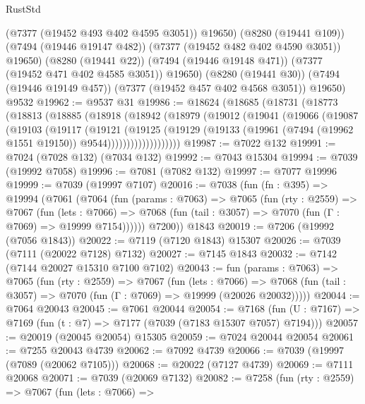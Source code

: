 \begin{lexlean}{RustStd}
\begin{coremodule}
            (@7377 (@19452 @493 @402 @4595 @3051))
            @19650)
          (@8280 (@19441 @109))
          (@7494 (@19446 @19147 @482))
          (@7377 (@19452 @482 @402 @4590 @3051))
          @19650)
        (@8280 (@19441 @22))
        (@7494 (@19446 @19148 @471))
        (@7377 (@19452 @471 @402 @4585 @3051))
        @19650)
      (@8280 (@19441 @30))
      (@7494 (@19446 @19149 @457))
      (@7377 (@19452 @457 @402 @4568 @3051))
      @19650)
    @9532
@19962 := @9537 @31
@19986 := @18624
    (@18685
      (@18731
        (@18773
          (@18813
            (@18885
              (@18918
                (@18942
                  (@18979
                    (@19012
                      (@19041
                        (@19066
                          (@19087
                            (@19103
                              (@19117
                                (@19121
                                  (@19125
                                    (@19129
                                      (@19133
                                        (@19961
                                          (@7494 (@19962 @1551 @19150))
                                          @9544)))))))))))))))))))
@19987 := @7022 @132
@19991 := @7024 (@7028 @132) (@7034 @132)
@19992 := @7043 @15304
@19994 := @7039 (@19992 @7058)
@19996 := @7081 (@7082 @132)
@19997 := @7077 @19996
@19999 := @7039 (@19997 @7107)
@20016 := @7038
    (fun (fn : @395) =>
    @19994
      (@7061
        (@7064
          (fun (params : @7063) =>
          @7065
            (fun (rty : @2559) =>
            @7067
              (fun (lets : @7066) =>
              @7068 (fun (tail : @3057) => @7070 (fun (Γ : @7069) => @19999 @7154))))))
        @7200))
    @1843
@20019 := @7206 (@19992 (@7056 @1843))
@20022 := @7119 (@7120 @1843) @15307
@20026 := @7039 (@7111 (@20022 @7128) @7132)
@20027 := @7145 @1843
@20032 := @7142 (@7144 @20027 @15310 @7100 @7102)
@20043 := fun (params : @7063) =>
  @7065
    (fun (rty : @2559) =>
    @7067
      (fun (lets : @7066) =>
      @7068 (fun (tail : @3057) => @7070 (fun (Γ : @7069) => @19999 (@20026 @20032)))))
@20044 := @7064 @20043
@20045 := @7061 @20044
@20054 := @7168
    (fun (U : @7167) => @7169 (fun (t : @7) => @7177 (@7039 (@7183 @15307 @7057) @7194)))
@20057 := @20019 (@20045 @20054) @15305
@20059 := @7024 @20044 @20054
@20061 := @7255 @20043 @4739
@20062 := @7092 @4739
@20066 := @7039 (@19997 (@7089 (@20062 @7105)))
@20068 := @20022 (@7127 @4739)
@20069 := @7111 @20068
@20071 := @7039 (@20069 @7132)
@20082 := @7258
    (fun (rty : @2559) =>
    @7067
      (fun (lets : @7066) =>

\end{coremodule}
\end{lexlean}
